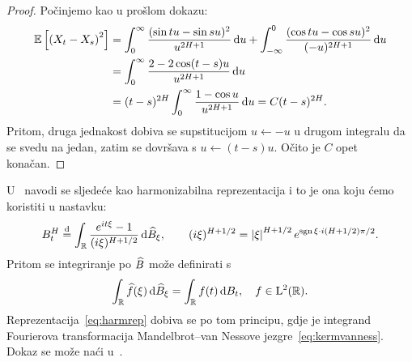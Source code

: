 \documentclass[main.tex]{subfiles}
\begin{document}
\begin{proof}
	Počinjemo kao u prošlom dokazu:
	\begin{align}
		\mathbb{E} \left[ \left( X_t-X_s \right)^2 \right] & =
		\int_0^\infty \frac{(\sin tu - \sin su)^2}{u^{2H+1}} \,\mathrm d u +
		\int_{-\infty}^0 \frac{(\cos tu - \cos su)^2}{(-u)^{2H+1}} \,\mathrm d u                                  \\
		                                           & = \int_0^\infty \frac{2-2\cos(t-s)u}{u^{2H+1}} \,\mathrm d u \\ &=  (t-s)^{2H}\int_0^\infty \frac{1-\cos u}{u^{2H+1}} \,\mathrm d u =C(t-s)^{2H}.
	\end{align}
	Pritom, druga jednakost dobiva se supstitucijom \( u \leftarrow -u \)
	u drugom integralu da se svedu na jedan, zatim se
	dovršava s \( u \leftarrow (t-s)u \). Očito je \( C \) opet konačan.
\end{proof}

\begin{komentar}\label{kom:harmrep}
	U~\cite{ayache} navodi se sljedeće kao harmonizabilna reprezentacija i to
	je ona koju ćemo koristiti u nastavku:
	\begin{equation}\label{eq:harmrep}
		B^H_t \stackrel{\mathrm d}{=}
		\int_{\mathbb{R}} \frac{e^{it\xi}-1}{(i\xi)^{H+1/2}} \,\mathrm d \widehat{B}_\xi,
		\qquad
		(i\xi)^{H+1/2} = \left| {\xi} \right|^{H+1/2}e^{\operatorname{sgn}\xi \cdot i(H+1/2)\pi/2}.
	\end{equation}
	Pritom se integriranje po \( \widehat{B} \) može definirati s
	\begin{equation}
		\int_{\mathbb{R}} \widehat{f}(\xi) \,\mathrm d \widehat{B} _\xi = \int_{\mathbb{R}} f(t) \,\mathrm d B_t, \quad
		f \in \mathrm{L}^2(\mathbb{R}).
	\end{equation}
	Reprezentacija~\eqref{eq:harmrep} dobiva se po tom principu,
	gdje je integrand Fourierova transformacija Mandelbrot--van Nessove jezgre~\eqref{eq:kermvanness}.
	Dokaz se može naći u~\cite{pipiras}.
\end{komentar}
\end{document}
